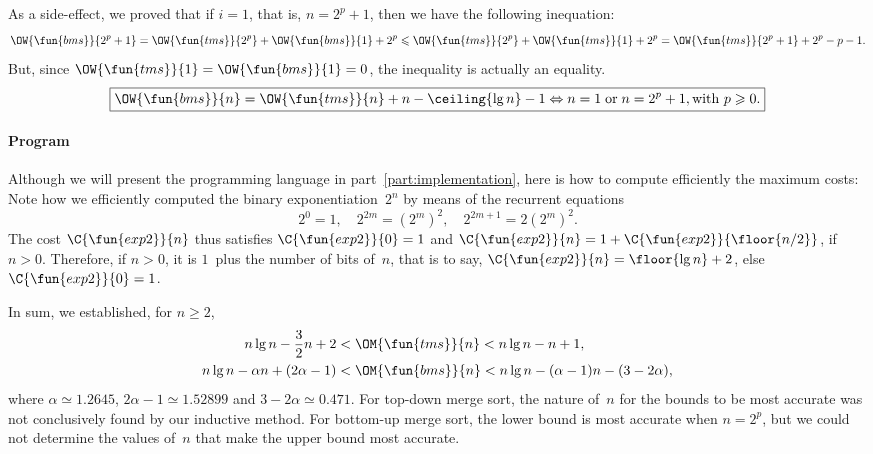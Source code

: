 As a side\hyp{}effect, we proved that if \(i=1\), that is, \(n=2^p +
1\), then we have the following inequation:
\begin{equation*}
\OW{\fun{bms}}{2^p+1} = \OW{\fun{tms}}{2^p} +
\OW{\fun{bms}}{1} + 2^p \leqslant \OW{\fun{tms}}{2^p} +
\OW{\fun{tms}}{1} + 2^p = \OW{\fun{tms}}{2^p+1} + 2^p - p - 1.
\end{equation*}
But, since \(\OW{\fun{tms}}{1} = \OW{\fun{bms}}{1} = 0\), the
inequality is actually an equality.
\begin{equation*}
\boxed{\OW{\fun{bms}}{n} = \OW{\fun{tms}}{n} + n - \ceiling{\lg n} - 1
  \Leftrightarrow n=1 \;\text{or}\; n=2^p+1, \text{with \(p \geqslant
    0\)}.}
\end{equation*}

\paragraph{Program}

Although we will present the programming language \Erlang in
part~\ref{part:implementation}, here is how to compute efficiently the
maximum costs:  Note how we efficiently
computed the binary exponentiation~\(2^n\) by means of the recurrent
equations
\begin{equation*}
2^0 = 1,\quad 2^{2m} = (2^m)^2,\quad 2^{2m+1} =  2(2^m)^2.
\end{equation*}
The cost \(\C{\fun{exp2}}{n}\) thus satisfies \(\C{\fun{exp2}}{0} =
1\) and \(\C{\fun{exp2}}{n} = 1 + \C{\fun{exp2}}{\floor{n/2}}\), if
\(n > 0\). Therefore, if \(n > 0\), it is \(1\)~plus the number of
bits of~\(n\), that is to say, \(\C{\fun{exp2}}{n} = \floor{\lg n} +
2\), else \(\C{\fun{exp2}}{0} = 1\).


In sum, we established, for \(n \geqslant 2\),
\begin{align*}
n\lg n - \frac{3}{2}n + 2 &< \OM{\fun{tms}}{n} < n\lg n - n + 1,\\
n\lg n - \alpha n + (2\alpha - 1) &< \OM{\fun{bms}}{n}
< n\lg n - (\alpha - 1)n - (3 - 2\alpha),
\end{align*}
where \(\alpha \simeq 1.2645\), \(2\alpha - 1 \simeq 1.52899\) and \(3
- 2\alpha \simeq 0.471\). For top\hyp{}down merge sort, the nature
of~\(n\) for the bounds to be most accurate was not conclusively found
by our inductive method. For bottom\hyp{}up merge sort, the lower
bound is most accurate when \(n=2^p\), but we could not determine the
values of~\(n\) that make the upper bound most accurate.

